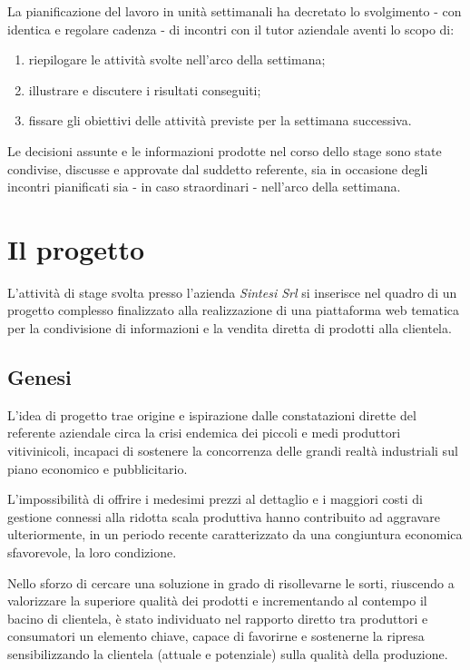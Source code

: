\documentclass[11pt,a4paper,headsepline,hidelinks]{scrreprt} %
\begin{document}
	La pianificazione del lavoro in unità settimanali ha decretato lo svolgimento - con identica e regolare cadenza - di incontri con il tutor aziendale aventi lo scopo di:
	\begin{enumerate}
	\item riepilogare le attività svolte nell'arco della settimana;
	\item illustrare e discutere i risultati conseguiti;
	\item fissare gli obiettivi delle attività previste per la settimana successiva.
	\end{enumerate}   

	Le decisioni assunte e le informazioni prodotte nel corso dello stage sono state condivise, discusse e approvate dal suddetto referente, sia in occasione degli incontri pianificati sia - in caso straordinari - nell'arco della settimana.

	\chapter{Il progetto}
	\label{ch:tesi:progetto}
	L'attività di stage svolta presso l'azienda \textit{Sintesi Srl} si inserisce nel quadro di un progetto complesso finalizzato alla realizzazione di una piattaforma web tematica per la condivisione di informazioni e la vendita diretta di prodotti alla clientela.

	\section{Genesi}
	\label{sec:progetto:genesi}
	L'idea di progetto trae origine e ispirazione dalle constatazioni dirette del referente aziendale circa la crisi endemica dei piccoli e medi produttori vitivinicoli, incapaci di sostenere la concorrenza delle grandi realtà industriali sul piano economico e pubblicitario.

	L'impossibilità di offrire i medesimi prezzi al dettaglio e i maggiori costi di gestione connessi alla ridotta scala produttiva hanno contribuito ad aggravare ulteriormente, in un periodo recente caratterizzato da una congiuntura economica sfavorevole, la loro condizione.

	Nello sforzo di cercare una soluzione in grado di risollevarne le sorti, riuscendo a valorizzare la superiore qualità dei prodotti e incrementando al contempo il bacino di clientela, è stato individuato nel rapporto diretto tra produttori e consumatori un elemento chiave, capace di favorirne e sostenerne la ripresa sensibilizzando la clientela (attuale e potenziale) sulla qualità della produzione.
\end{document}
